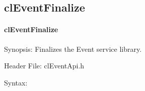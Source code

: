 \begin{flushleft}
\subsection{clEventFinalize}
\hypertarget{pageem102}{}\paragraph{cl\-Event\-Finalize}\label{pageem102}
\begin{Desc}
\item[Synopsis:]Finalizes the Event service library.
\end{Desc}
\begin{Desc}
\item[Header File:]clEventApi.h\end{Desc}
\begin{Desc}
\item[Syntax:]


\end{Desc}
\end{flushleft}
